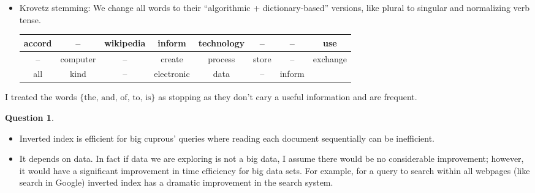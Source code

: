 \documentclass[11pt,a4paper,reqno]{amsart}
\theoremstyle{definition}
\theoremstyle{notation}
\newtheorem{question}[theorem]{Question}
\begin{document}
\begin{itemize}
\item Krovetz stemming: We change all words to their ``algorithmic + dictionary-based'' versions, like  plural to singular and normalizing verb tense.
\begin{table}[h]
\begin{tabular}{|c|c|c|c|c|c|c|c|}
\hline
accord & -- & wikipedia & inform & technology & -- & -- & use  \\ \hline
-- & computer & -- & create & process & store & -- & exchange \\ \hline
 all & kind & -- & electronic & data & -- & inform & \\ \hline
\end{tabular}
\end{table}
\end{itemize}
I treated the words $\{\text{the, and, of, to, is}\}$ as stopping as they don't cary a useful information and are frequent. 




\begin{question}%
\end{question}
\begin{itemize}
\item Inverted index is efficient for big cuprous' queries where reading each document sequentially can be inefficient. 
\item It depends on data. In fact if data we are exploring is not a big data, I assume there would be no considerable improvement; however, it would have a significant improvement in time efficiency for big data sets. For example, for a query to search within all webpages (like search in Google) inverted index has a dramatic improvement in the search system. 
\end{itemize}
\end{document}
